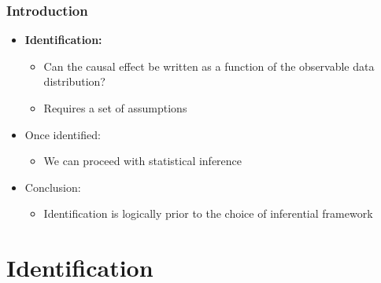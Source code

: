 \documentclass[12pt, compress]{beamer}
\begin{document}
\begin{frame}
	\frametitle{Introduction}

\begin{itemize}
	\item \textbf{Identification:}
	\begin{itemize}
		\item Can the causal effect be written as a function of the observable data distribution?
		\item Requires a set of assumptions
	\end{itemize}
	
	\medskip
	
	\item Once identified:
	\begin{itemize}
		\item We can proceed with statistical inference
	\end{itemize}
	
	\medskip
	
	\item Conclusion:
	\begin{itemize}
		\item Identification is logically prior to the choice of inferential framework
	\end{itemize}
\end{itemize}

\end{frame}

\section{Identification}
\end{document}
